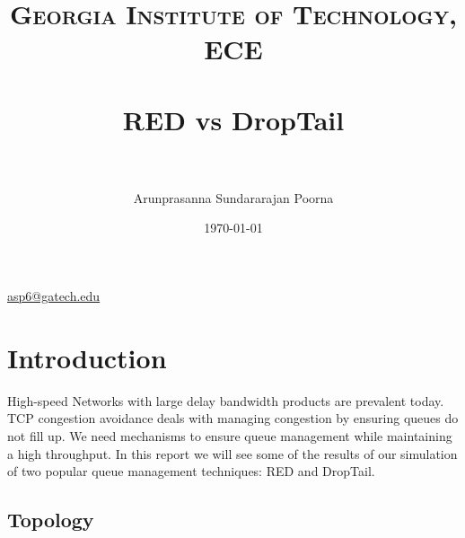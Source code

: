 \documentclass[paper=a4, fontsize=12pt]{scrartcl} %
\title{	
\normalfont \normalsize 
\textsc{Georgia Institute of Technology, ECE} \\ [25pt] %
\horrule{0.5pt} \\[0.4cm] %
\huge RED vs DropTail \\ %
\horrule{2pt} \\[0.5cm] %
}
\author{Arunprasanna Sundararajan Poorna} %
\date{\normalsize\today} %
\numberwithin{equation}{section} %
\numberwithin{figure}{section} %
\numberwithin{table}{section} %
\begin{document}
\maketitle 

\begin{center}
\href{mailto:asp6@gatech.edu}{\hspace{92pt}asp6@gatech.edu\newline}
\hspace{92pt}{ECE 6110\newline}
\hspace{88pt}{Spring 2015}
\end{center}

\vspace{60pt}
\section{Introduction}
%
High-speed Networks with large delay bandwidth products are prevalent today. TCP congestion avoidance deals with managing congestion by ensuring queues do not fill up. We need mechanisms to ensure queue management while maintaining a high throughput. In this report we will see some of the results of our simulation of two popular queue management techniques: RED and DropTail. 
\newpage
\subsection{Topology}
\end{document}
